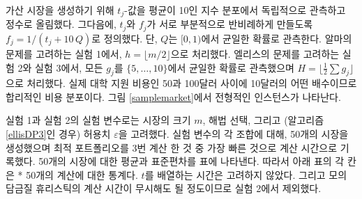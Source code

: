 \documentclass[11pt]{article} %
\newif\ifen
\theoremstyle{definition}
\theoremstyle{definition}
\begin{document}
\def\nmarkets{50}
\ifen
To generate synthetic markets, we drew the $t_j$-values independently from an exponential distribution with a scale parameter of ten and rounded up to the nearest integer. To achieve partial negative correlation between $t_j$ and $f_j$, we then set $f_j = 1 / (t_j + 10\,Q)$, where $Q$ is drawn uniformly from the interval $[0, 1)$. In Experiment 1, which concerns Alma's problem, we set $h = \lfloor m/ 2 \rfloor$. In Experiments 2 and 3, which concern Ellis's problem, each $g_j$ is drawn uniformly from the set $\{5, \dots, 10\}$ and we set $H = \lfloor \frac{1}{2} \sum g_j \rfloor$. This cost distribution resembles real-world college application fees, which are often multiples of \$10 between \$50 and \$100. A typical instance is shown in Figure \ref{samplemarket}.
\else
가산 시장을 생성하기 위해 $t_j$-값을 평균이 10인 지수 분포에서 독립적으로 관측하고 정수로 올림했다. 그다음에, $t_j$와 $f_j$가 서로 부분적으로 반비례하게 만들도록 $f_j = 1 / (t_j + 10\,Q)$로 정의했다. 단, $Q$는 $[0, 1)$에서 균일한 확률로 관측한다. 알마의 문제를 고려하는 실험 1에서, $h = \lfloor m/ 2 \rfloor$으로 처리했다. 엘리스의 문제를 고려하는 실험 2와 실험 3에서, 모든  $g_j$를 $\{5, \dots, 10\}$에서 균일한 확률로 관측했으며 $H = \lfloor \frac{1}{2} \sum g_j \rfloor$으로 처리했다. 실제 대학 지원 비용인 50과 100달러 사이에 10달러의 어떤 배수이므로 합리적인 비용 분포이다. 그림 \ref{samplemarket}에서 전형적인 인스턴스가 나타난다.
\fi

\ifen
The experimental variables in Experiments 1 and 2 were the market size $m$, the choice of algorithm, and (for Algorithm \ref{ellisDP3}) the tolerance $\varepsilon$. For each combination of the experimental variables, we generated \nmarkets~markets, and the optimal portfolio was computed three times, with the fastest of the three repetitions recorded as the computation time. We then report the mean and standard deviation across the \nmarkets~markets. Therefore, each cell of each table below represents a statistic over {\the\numexpr 3 * \nmarkets \relax}~computations. Where applicable, we do not count the time required to sort the entries of $t$. As the simulated-annealing heuristic's computation time is negligible, it was excluded from Experiment 2. 
\else
실험 1과 실험 2의 실험 변수로는 시장의 크기 $m$, 해법 선택, 그리고 (알고리즘 \ref{ellisDP3}인 경우) 허용치 $\varepsilon$을 고려했다. 실험 변수의 각 조합에 대해,  \nmarkets 개의 시장을 생성했으며 최적 포트폴리오를 3번 계산 한 것 중 가장 빠른 것으로 계산 시간으로 기록했다. \nmarkets 개의 시장에 대한 평균과 표준편차를 표에 나타낸다. 따라서 아래 표의 각 칸은 {\the{} * \nmarkets \relax}개의 계산에 대한 통계다. $t$를 배열하는 시간은 고려하지 않았다. 그리고 모의 담금질 휴리스틱의 계산 시간이 무시해도 될 정도이므로 실험 2에서 제외했다. 
\fi
\end{document}
